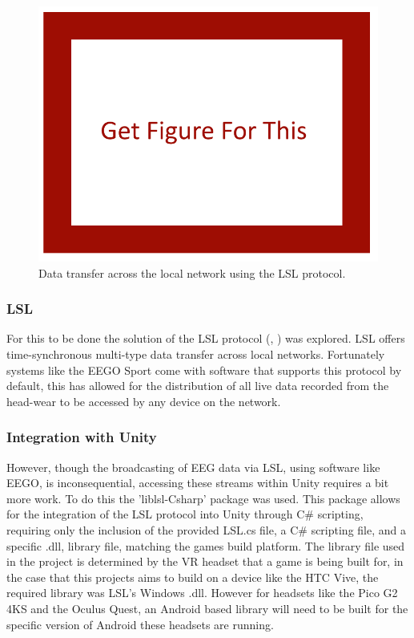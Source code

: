 \documentclass[11pt, a4paper]{article}
\newcommand{\ccite}[1]{(\citeauthor{#1}, \citeyear{#1})}
\begin{document}
\begin{figure}[H]
	\centering
	\includegraphics[width = 0.7 \linewidth] {[ Figures ]/Get Figure.png}
	\caption{Data transfer across the local network using the LSL protocol.}
	\label{fig:networking_diagram}
\end{figure}


\subsubsection{LSL}	
For this to be done the solution of the LSL protocol \ccite{labstreaminglayer} was explored. LSL offers time-synchronous multi-type data transfer across local networks. Fortunately systems like the EEGO Sport come with software that supports this protocol by default, this has allowed for the distribution of all live data recorded from the head-wear to be accessed by any device on the network.

  
\subsubsection{Integration with Unity}	
However, though the broadcasting of EEG data via LSL, using software like EEGO, is inconsequential, accessing these streams within Unity requires a bit more work. To do this the 'liblsl-Csharp' package was used. This package allows for the integration of the LSL protocol into Unity through C\# scripting, requiring only the inclusion of the provided LSL.cs file, a C\# scripting file, and a specific .dll, library file, matching the games build platform. The library file used in the project is determined by the VR headset that a game is being built for, in the case that this projects aims to build on a device like the HTC Vive, the required library was LSL's Windows .dll. However for headsets like the Pico G2 4KS and the Oculus Quest, an Android based library will need to be built for the specific version of Android these headsets are running. 
\end{document}
